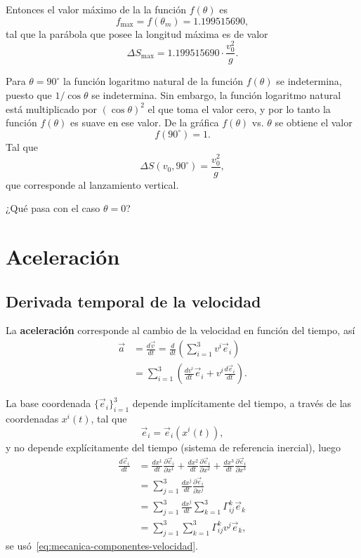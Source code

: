 \documentclass[../apunte_mecanica_clasica.tex]{subfiles}%
\begin{document}
Entonces el valor máximo de la la función $f(\theta)$ es
\begin{equation*}
    f_{\max}=f(\theta_m)=1.199515690,
\end{equation*}
tal que la parábola que posee la longitud máxima es de valor
\begin{equation*}
    \Delta S_{\max}=1.199515690\cdot\frac{v_0^2}{g}.
\end{equation*}

Para $\theta=90^{\circ}$ la función logaritmo natural de la función $f(\theta)$ se indetermina, puesto que $1/\cos\theta$ se indetermina. Sin embargo, la función logaritmo natural está multiplicado por $(\cos\theta)^2$ el que toma el valor cero, y por lo tanto la función $f(\theta)$ es suave en ese valor. De la gráfica $f(\theta)$ vs. $\theta$ se obtiene el valor
\begin{equation*}
    f(90^{\circ})=1.
\end{equation*}
Tal que
\begin{equation*}
    \Delta S(v_0,90^{\circ})=\frac{v_0^2}{g},
\end{equation*}
que corresponde al lanzamiento vertical.

¿Qué pasa con el caso $\theta=0$?

\newpage
\section{Aceleración}

\subsection{Derivada temporal de la velocidad}

La \textbf{aceleración} corresponde al cambio de la velocidad en función del tiempo, así
\begin{align*}
    \vec a
    &=\frac{d\vec v}{dt}
      =\frac{d}{dt}\left(\sum_{i=1}^{3}v^i\vec e_i\right) \\
    &=\sum_{i=1}^{3}\left(\frac{dv^i}{dt}\vec e_i+v^i\frac{d\vec e_i}{dt}\right).
\end{align*}

La base coordenada $\{\vec e_i\}_{i=1}^{3}$ depende implícitamente del tiempo, a través de las coordenadas $x^i(t)$, tal que
\begin{equation*}
    \vec e_i=\vec e_i(x^i(t)),
\end{equation*}
y no depende explícitamente del tiempo (sistema de referencia inercial), luego
\begin{align*}
    \frac{d\vec e_i}{dt}
    &=\frac{dx^1}{dt}\frac{\partial \vec e_i}{\partial x^1}
     +\frac{dx^2}{dt}\frac{\partial \vec e_i}{\partial x^2}
     +\frac{dx^3}{dt}\frac{\partial \vec e_i}{\partial x^3} \\
    &=\sum_{j=1}^{3}\frac{dx^j}{dt}\frac{\partial \vec e_i}{\partial x^j} \\
    &=\sum_{j=1}^{3}\frac{dx^j}{dt}\sum_{k=1}^{3}\Gamma^{k}_{ij}\vec e_k \\
    &=\sum_{j=1}^{3}\sum_{k=1}^{3}\Gamma^{k}_{ij}v^j\vec e_k,
\end{align*}
se usó~\eqref{eq:mecanica-componentes-velocidad}.
\end{document}
